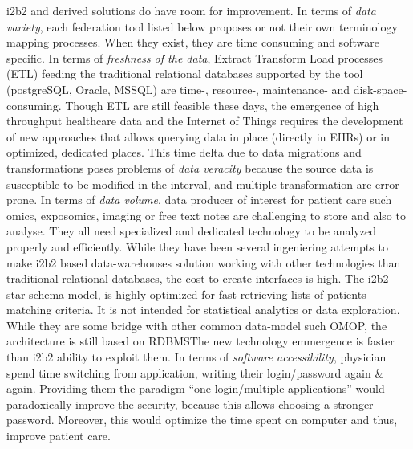 \documentclass{amia}
\begin{document}
i2b2 and derived solutions do have room for improvement.  In terms of \textit{data variety}, each federation tool listed below proposes or not their own terminology mapping processes\cite{shrine}. When they exist\cite{ehr4crlesson}, they are time consuming and software specific\cite{i2b2map}.  In terms of \textit{freshness of the data}, Extract Transform Load processes (ETL) feeding the traditional relational databases supported by the tool (postgreSQL, Oracle, MSSQL) are time-, resource-, maintenance- and disk-space-consuming. Though ETL are still feasible these days, the emergence of high throughput healthcare data and the Internet of Things requires the development of new approaches that allows querying data in place (directly in EHRs) or in optimized, dedicated places. This time delta due to data migrations and transformations poses problems of \textit{data veracity} because the source data is susceptible to be modified in the interval, and multiple transformation are error prone.  In terms of \textit{data volume}, data producer of interest for patient care such omics, exposomics, imaging or free text notes are challenging to store and also to analyse. They all need specialized and dedicated technology to be analyzed properly and efficiently. While they have been several ingeniering attempts to make i2b2 based data-warehouses solution working with other technologies than traditional relational databases, the cost to create interfaces is high\cite{i2b2nosql}. The i2b2 star schema model, is highly optimized for fast retrieving lists of patients matching criteria. It is not intended for statistical analytics or data exploration\cite{i2b2export}. While they are some bridge with other common data-model such OMOP, the architecture is still based on RDBMS\cite{pcornet}The new technology emmergence is faster than i2b2 ability to exploit them.  In terms of \textit{software accessibility}, physician spend time switching from application, writing their login/password again \& again. Providing them the paradigm ``one login/multiple applications'' would paradoxically improve the security, because this allows choosing a stronger password. Moreover, this would optimize the time spent on computer and thus, improve patient care.
\end{document}
